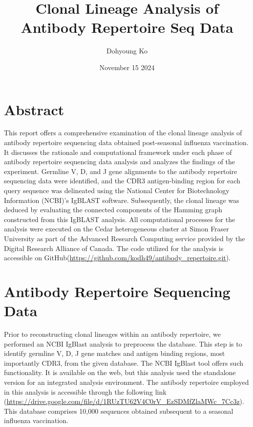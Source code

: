 \documentclass{article}
\title{Clonal Lineage Analysis of Antibody Repertoire Seq Data}
\author{Dohyoung Ko}
\date{November 15 2024}
\begin{document}
\renewcommand{\theFancyVerbLine}{
  \sffamily\textcolor[rgb]{0.5,0.5,0.5}{\scriptsize\arabic{FancyVerbLine}}}


\maketitle

\section*{\centering Abstract}
This report offers a comprehensive examination of the clonal lineage analysis of antibody repertoire sequencing data obtained post-seasonal influenza vaccination. It discusses the rationale and computational framework under each phase of antibody repertoire sequencing data analysis and analyzes the findings of the experiment. Germline V, D, and J gene alignments to the antibody repertoire sequencing data were identified, and the CDR3 antigen-binding region for each query sequence was delineated using the National Center for Biotechnology Information (NCBI)'s IgBLAST software. Subsequently, the clonal lineage was deduced by evaluating the connected components of the Hamming graph constructed from this IgBLAST analysis. All computational processes for the analysis were executed on the Cedar heterogeneous cluster at Simon Fraser University as part of the Advanced Research Computing service provided by the Digital Research Alliance of Canada. The code utilized for the analysis is accessible on GitHub(\url{https://github.com/kodh49/antibody_repertoire.git}).

\hfill

\tableofcontents

\hfill


\section{Antibody Repertoire Sequencing Data}
Prior to reconstructing clonal lineages within an antibody repertoire, we performed an NCBI IgBlast analysis to preprocess the database. This step is to identify germline V, D, J gene matches and antigen binding regions, most importantly CDR3, from the given database. The NCBI IgBlast tool offers such functionality. It is available on the web, but this analysis used the standalone version for an integrated analysis environment. The antibody repertoire employed in this analysis is accessible through the following link (\url{https://drive.google.com/file/d/1RUzTU62V4C0rV_EzSDMfZlaMWc_7Cc3z}). This database comprises 10,000 sequences obtained subsequent to a seasonal influenza vaccination.
\end{document}
